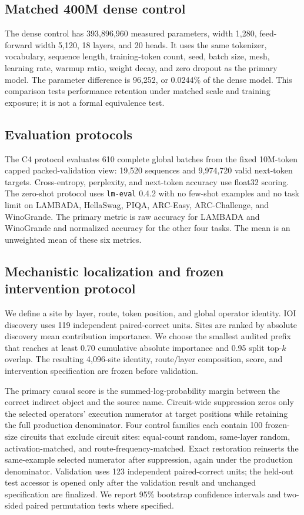 \documentclass{article}
\begin{document}
\subsection{Matched 400M dense control}

The dense control has 393,896,960 measured parameters, width 1,280, feed-forward
width 5,120, 18 layers, and 20 heads. It uses the same tokenizer, vocabulary,
sequence length, training-token count, seed, batch size, mesh, learning rate,
warmup ratio, weight decay, and zero dropout as the primary model. The
parameter difference is 96,252, or 0.0244\% of the dense model. This comparison
tests performance retention under matched scale and training exposure; it is
not a formal equivalence test.

\subsection{Evaluation protocols}

The C4 protocol evaluates 610 complete global batches from the fixed
10M-token capped packed-validation view: 19,520 sequences and 9,974,720 valid
next-token targets. Cross-entropy, perplexity, and next-token accuracy use
float32 scoring. The zero-shot protocol uses \texttt{lm-eval} 0.4.2 with no
few-shot examples and no task limit on LAMBADA, HellaSwag, PIQA, ARC-Easy,
ARC-Challenge, and WinoGrande. The primary metric is raw accuracy for LAMBADA
and WinoGrande and normalized accuracy for the other four tasks. The mean is
an unweighted mean of these six metrics.

\subsection{Mechanistic localization and frozen intervention protocol}
\label{sec:protocol}

We define a site by layer, route, token position, and global operator identity.
IOI discovery uses 119 independent paired-correct units. Sites are ranked by
absolute discovery mean contribution importance. We choose the smallest
audited prefix that reaches at least 0.70 cumulative absolute importance and
0.95 split top-\(k\) overlap. The resulting 4,096-site identity, route/layer
composition, score, and intervention specification are frozen before
validation.

The primary causal score is the summed-log-probability margin between the
correct indirect object and the source name. Circuit-wide suppression zeros
only the selected operators' execution numerator at target positions while
retaining the full production denominator. Four control families each contain
100 frozen-size circuits that exclude circuit sites: equal-count random,
same-layer random, activation-matched, and route-frequency-matched. Exact
restoration reinserts the same-example selected numerator after suppression,
again under the production denominator. Validation uses 123 independent
paired-correct units; the held-out test accessor is opened only after the
validation result and unchanged specification are finalized. We report 95\%
bootstrap confidence intervals and two-sided paired permutation tests where
specified.
\end{document}
